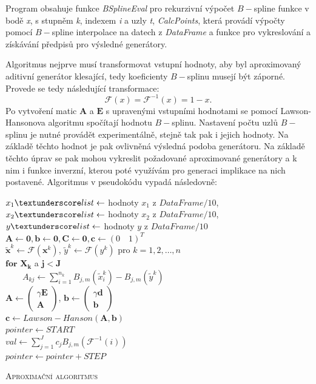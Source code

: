 Program obsahuje funkce \textit{BSplineEval} pro rekurzivní výpočet $B-$spline funkce v bodě \textit{x}, s stupněm \textit{k}, indexem \textit{i} a uzly \textit{t}, \textit{CalcPoints}, která provádí výpočty pomocí $B-$spline interpolace na datech z \textit{DataFrame} a funkce pro vykreslování a získávání předpis\r u pro výsledné generátory.

Algoritmus nejprve musí transformovat vstupní hodnoty, aby byl aproximovaný aditivní generátor klesající, tedy koeficienty $B-$splinu musejí být záporné. Provede se tedy následující transformace: $$
  \mathcal{F}(x) = \mathcal{F}^{-1}(x) = 1-x.
$$
Po vytvoření matic $\mathbf{A}$ a $\mathbf{E}$ s upravenými vstupními hodnotami se pomocí Lawson-Hansonova algoritmu spočítají hodnotu $B-$splinu. Nastavení počtu uzl\r u $B-$splinu je nutné provádět experimentálně, stejně tak pak i jejich hodnoty. Na základě těchto hodnot je pak ovlivněná výsledná podoba generátoru. Na základě těchto \' uprav se pak mohou vykreslit požadované aproximované generátory a k nim i funkce inverzní, kterou poté využívám pro generaci implikace na nich postavené. Algoritmus v pseudok\'odu vypadá následovně:

\begin{algorithm}[H]
 \SetNlSty{}{}{:}
 \SetNlSkip{-1.2em}
 \SetInd{1em}{1em}
 \BlankLine
 \Indentp{1.7em}
    $x_1\textunderscore list \gets$ hodnoty $x_1$ z $\textit{DataFrame} / 10$, $x_2\textunderscore list \gets$ hodnoty $x_2$ z $\textit{DataFrame} / 10$, $y\textunderscore list \gets$ hodnoty $y$ z $\textit{DataFrame} / 10$\\
    $\mathbf{A} \gets \mathbf{0}, \mathbf{b} \gets \mathbf{0}, \mathbf{C} \gets \mathbf{0}, \mathbf{c} \gets (0\quad1)^T$\\
    $\widetilde{\mathbf{x}}^k \gets \mathcal{F}(\mathbf{x}^k)$, $\widetilde{y}^k \gets \mathcal{F}(y^k)$ pro $k = 1,2,\dots,n$\\
    $\textbf{for } \mathbf{ X_k}$ a $\mathbf{j < J}$\\
    $\qquad A_{kj} \gets \sum_{i = 1}^{n_k}B_{j,m}(\widetilde{x}_i^k) - B_{j,m}(\widetilde{y}^k)$ \\
    $\mathbf{A} \gets \begin{pmatrix} \gamma\mathbf{E} \\ \mathbf{A} \end{pmatrix}$, 
      $\mathbf{b} \gets \begin{pmatrix} \gamma\mathbf{d} \\ \mathbf{b} \end{pmatrix}$\\
    $\mathbf{c} \gets Lawson-Hanson(\mathbf{A}, \mathbf{b})$ \\
    $pointer \gets START$\\
     {
    {
	$val \gets \sum_{j = 1}^Jc_jB_{j,m}(\mathcal{F}^{-1}(i))$\\
	
      }
      $pointer \gets pointer + STEP$
    }
 \caption{\textsc{Aproximační algoritmus}}
\end{algorithm}

